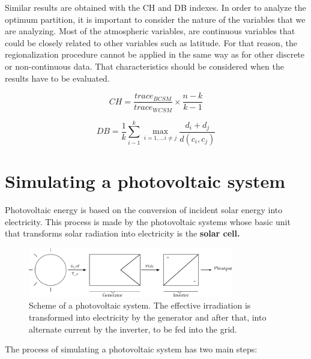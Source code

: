 Similar results are obtained with the CH and DB indexes. In order to analyze the optimum partition, it is important to consider the nature of the variables that we are analyzing. Most of the atmospheric variables, are continuous variables that could be closely related to other variables such as latitude. For that reason, the regionalization procedure cannot be applied in the same way as for other discrete or non-continuous data. That characteristics should be considered when the results have to be evaluated.

\begin{equation}\label{eq:calinski}
    CH =\frac{trace_{BCSM}}{trace_{WCSM}}\times\frac{n-k}{k-1}
\end{equation}

\begin{equation}\label{eq:davies}
    DB =\frac{1}{k}\sum_{i-1}^{k}\max_{i=1,...i\neq{j}}{\frac{d_{i}+d_{j}}{d(c_i,c_j)}}
\end{equation}


\section{Simulating a photovoltaic system}

Photovoltaic energy is based on the conversion of incident solar energy into electricity. This process is made by the photovoltaic systems whose basic unit that transforms solar radiation into electricity is the \textbf{solar cell.}\\

\begin{figure}
\centering
\includegraphics[width=0.8\textwidth]{figs/pvsistem.pdf}
\caption[Scheme of a photovoltaic system]{Scheme of a photovoltaic system. The effective irradiation is transformed into electricity by the generator and after that, into alternate current by the inverter, to be fed into the grid.}
\label{fig:ecad}
\end{figure}

The process of simulating a photovoltaic system has two main steps:

